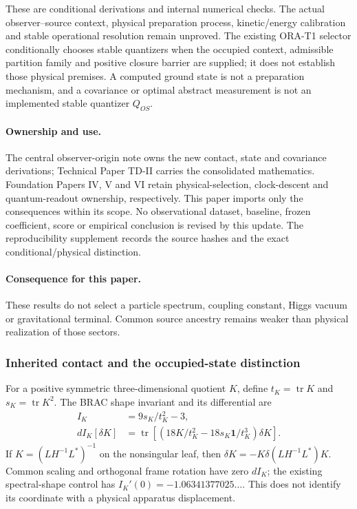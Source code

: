 \documentclass[11pt]{article}
\begin{document}
These are conditional derivations and internal numerical checks. The actual
observer--source context, physical preparation process, kinetic/energy
calibration and stable operational resolution remain unproved. The existing
ORA-T1 selector conditionally chooses stable quantizers when the occupied
context, admissible partition family and positive closure barrier are supplied;
it does not establish those physical premises. A computed ground state is not
a preparation mechanism, and a covariance or optimal abstract measurement is
not an implemented stable quantizer $Q_{OS}$.

\paragraph{Ownership and use.}
The central observer-origin note owns the new contact, state and covariance
derivations; Technical Paper TD-II carries the consolidated
mathematics. Foundation Papers IV, V and VI retain physical-selection,
clock-descent and quantum-readout ownership, respectively. This paper imports
only the consequences within its scope. No observational dataset, baseline,
frozen coefficient, score or empirical conclusion is revised by this update.
The reproducibility supplement records the source hashes and the exact
conditional/physical distinction.

\paragraph{Consequence for this paper.}
These results do not select a particle spectrum, coupling constant, Higgs vacuum or gravitational terminal. Common source ancestry remains weaker than physical realization of those sectors.

\subsubsection{Inherited contact and the occupied-state distinction}
For a positive symmetric three-dimensional quotient $K$, define
$t_K=\operatorname{tr}K$ and $s_K=\operatorname{tr}K^2$. The BRAC shape
invariant and its differential are
\begin{align}
 I_K&=9s_K/t_K^2-3,\\
 dI_K[\delta K]&=\operatorname{tr}
 \left[\left(18K/t_K^2-18s_K\mathbf{1}/t_K^3\right)\delta K\right].
\end{align}
If $K=(LH^{-1}L^*)^{-1}$ on the nonsingular leaf, then
$\delta K=-K\delta(LH^{-1}L^*)K$. Common scaling and orthogonal frame
rotation have zero $dI_K$; the existing spectral-shape control has
$I_K'(0)=-1.06341377025\ldots$. This does not identify its coordinate with
a physical apparatus displacement.
\end{document}

